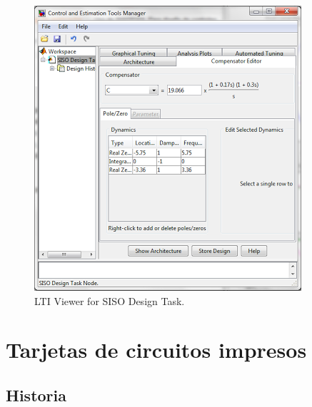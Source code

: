 \documentclass[a4paper,12pt,twoside]{proyectotanquesecci}
\begin{document}
\begin{figure}[h]
\centering
\includegraphics[scale=0.7]{Ventana18}
\renewcommand{\figurename}{Fig.}
\caption{LTI Viewer for SISO Design Task.}
\label{LTI Viewer for SISO Design Task.}
\end{figure}


\newpage







\appendix

\chapter{Tarjetas de circuitos impresos}

\section{Historia}
\end{document}
